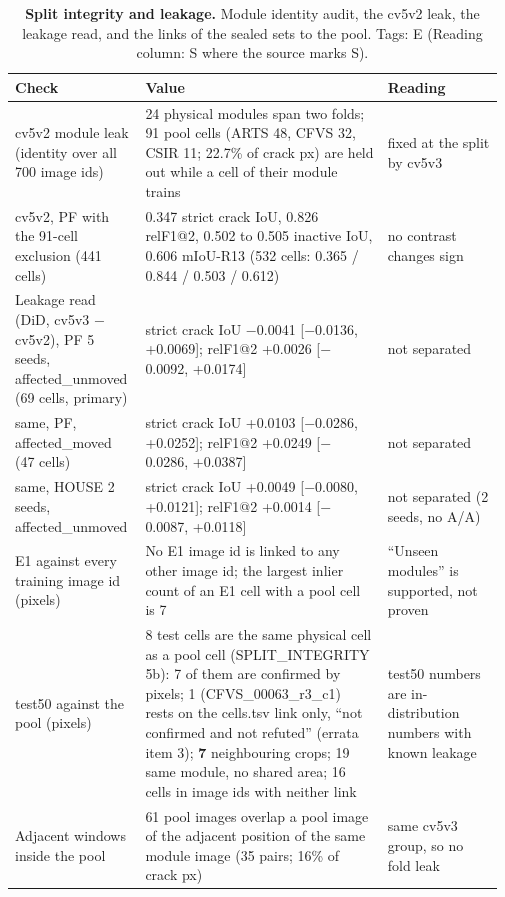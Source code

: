 \begin{table}[htbp]
\centering
\footnotesize
\setlength{\tabcolsep}{3pt}
\caption[Split integrity and leakage]{\textbf{Split integrity and leakage.} Module identity audit, the cv5v2 leak, the leakage read, and the links of the sealed sets to the pool. Tags: E (Reading column: S where the source marks S).}
\label{tab:T2}
\begin{tabular}{@{}>{\raggedright\arraybackslash\hspace{0pt}}p{0.251\linewidth}>{\raggedright\arraybackslash\hspace{0pt}}p{0.483\linewidth}>{\raggedright\arraybackslash\hspace{0pt}}p{0.232\linewidth}@{}}
\toprule
\textbf{Check} & \textbf{Value} & \textbf{Reading} \\
\midrule
cv5v2 module leak (identity over all 700 image ids) & 24 physical modules span two folds; 91 pool cells (ARTS 48, CFVS 32, CSIR 11; 22.7\% of crack px) are held out while a cell of their module trains & fixed at the split by cv5v3 \\
cv5v2, PF with the 91-cell exclusion (441 cells) & 0.347 strict crack IoU, 0.826 relF1@2, 0.502 to 0.505 inactive IoU, 0.606 mIoU-R13 (532 cells: 0.365 / 0.844 / 0.503 / 0.612) & no contrast changes sign \\
Leakage read (DiD, cv5v3 $-$ cv5v2), PF 5 seeds, affected\_\allowbreak{}unmoved (69 cells, primary) & strict crack IoU $-$0.0041 [$-$0.0136, +0.0069]; relF1@2 +0.0026 [$-$0.0092, +0.0174] & not separated \\
same, PF, affected\_\allowbreak{}moved (47 cells) & strict crack IoU +0.0103 [$-$0.0286, +0.0252]; relF1@2 +0.0249 [$-$0.0286, +0.0387] & not separated \\
same, HOUSE 2 seeds, affected\_\allowbreak{}unmoved & strict crack IoU +0.0049 [$-$0.0080, +0.0121]; relF1@2 +0.0014 [$-$0.0087, +0.0118] & not separated (2 seeds, no A/\allowbreak{}A) \\
E1 against every training image id (pixels) & No E1 image id is linked to any other image id; the largest inlier count of an E1 cell with a pool cell is 7 & ``Unseen modules'' is supported, not proven \\
test50 against the pool (pixels) & 8 test cells are the same physical cell as a pool cell (SPLIT\_\allowbreak{}INTEGRITY 5b): 7 of them are confirmed by pixels; 1 (CFVS\_\allowbreak{}00063\_\allowbreak{}r3\_\allowbreak{}c1) rests on the cells.tsv link only, ``not confirmed and not refuted'' (errata item 3); \textbf{7} neighbouring crops; 19 same module, no shared area; 16 cells in image ids with neither link & test50 numbers are in-distribution numbers with known leakage \\
Adjacent windows inside the pool & 61 pool images overlap a pool image of the adjacent position of the same module image (35 pairs; 16\% of crack px) & same cv5v3 group, so no fold leak \\
\bottomrule
\end{tabular}
\end{table}


